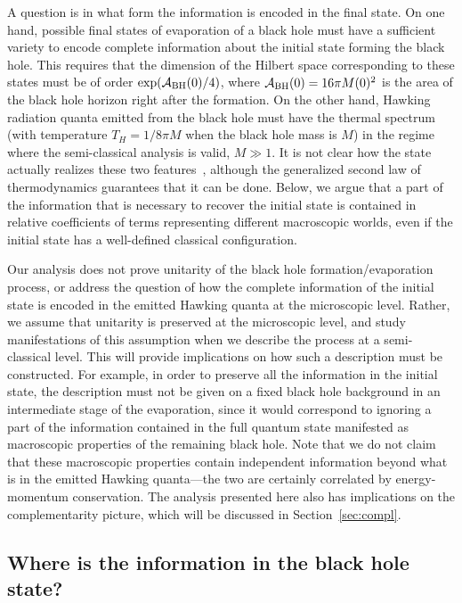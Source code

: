 \documentclass[12pt]{article}
\begin{document}
A question is in what form the information is encoded in the final state. 
On one hand, possible final states of evaporation of a black hole must 
have a sufficient variety to encode complete information about the 
initial state forming the black hole.  This requires that the dimension 
of the Hilbert space corresponding to these states must be of order 
$\exp({\cal A}_{\rm BH}(0)/4)$, where ${\cal A}_{\rm BH}(0) = 16\pi 
M(0)^2$ is the area of the black hole horizon right after the formation. 
On the other hand, Hawking radiation quanta emitted from the black hole 
must have the thermal spectrum (with temperature $T_H = 1/8\pi M$ when 
the black hole mass is $M$) in the regime where the semi-classical 
analysis is valid, $M \gg 1$.  It is not clear how the state actually 
realizes these two features~\cite{Page:1993up}, although the generalized 
second law of thermodynamics guarantees that it can be done.  Below, we 
argue that a part of the information that is necessary to recover the 
initial state is contained in relative coefficients of terms representing 
different macroscopic worlds, even if the initial state has a well-defined 
classical configuration.

Our analysis does not prove unitarity of the black hole 
formation/evaporation process, or address the question of how the complete 
information of the initial state is encoded in the emitted Hawking 
quanta at the microscopic level.  Rather, we assume that unitarity is 
preserved at the microscopic level, and study manifestations of this 
assumption when we describe the process at a semi-classical level.  This 
will provide implications on how such a description must be constructed. 
For example, in order to preserve all the information in the initial 
state, the description must not be given on a fixed black hole background 
in an intermediate stage of the evaporation, since it would correspond 
to ignoring a part of the information contained in the full quantum state 
manifested as macroscopic properties of the remaining black hole.  Note 
that we do not claim that these macroscopic properties contain independent 
information beyond what is in the emitted Hawking quanta---the two are 
certainly correlated by energy-momentum conservation.  The analysis 
presented here also has implications on the complementarity picture, 
which will be discussed in Section~\ref{sec:compl}.


\subsection{Where is the information in the black hole state?}
\label{subsec:where_info}
\end{document}
